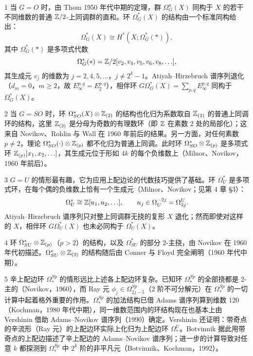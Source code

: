 \begin{example*}{1}
当 $G=O$ 时，由 Thom 1950 年代中期的定理，群 $\Omega_G^n(X)$ 同构于 $X$ 的若干不同维数的普通 $\mathbb{Z}/2$-上同调群的直和。环 $\Omega_G^*(X)$ 的结构由一个标准同构给出：
\[
\Omega_G^*(X)\cong H^*(X;\Omega_G^*(*)),
\]
其中 $\Omega_G^*(*)$ 是多项式代数
\[
\Omega_G^*(*)=\mathbb{Z}/2[v_2,v_4,v_5,v_6,v_8,\ldots],
\]
其生成元 $v_j$ 的维数为 $j=2,4,5,\ldots$，$j\ne 2^k-1$。Atiyah--Hirzebruch 谱序列退化（$d_m=0$，$m\ge 2$，故 $E_\infty^{p,q}=E_2^{p,q}$），相伴环 $G\Omega_G^*(X)=\sum_{p,q}E_\infty^{p,q}$ 同构于 $\Omega_G^*(X)$。
\end{example*}
\begin{example*}{2}
当 $G=SO$ 时，环 $\Omega_{SO}^*(X)\otimes\mathbb{Z}_{(2)}$ 的结构也化归为系数取自 $\mathbb{Z}_{(2)}$ 的普通上同调环的结构，这里 $\mathbb{Z}_{(2)}$ 是分母为奇数的有理数环（即 $\mathbb{Z}$ 在素数 2 处的局部化）；这来自 Novikov、Rohlin 与 Wall 在 1960 年前后的结果。另一方面，对任何素数 $p\ne 2$，理论 $\Omega_{SO}^*(\cdot)\otimes\mathbb{Z}_{(p)}$ 都不化归为普通上同调。此时环 $\Omega_{SO}^*\otimes\mathbb{Z}_{(p)}$ 是多项式环 $\mathbb{Z}_{(p)}[x_1,x_2,\ldots]$，其生成元位于形如 $4k$ 的每个负维数上（Milnor、Novikov，1960 年前后）。
\end{example*}
\begin{example*}{3}
$G=U$ 的情形最有趣，它为应用上配边论的代数技巧提供了基础。环 $\Omega_U^*$ 是多项式环，在每个偶的负维数上恰有一个生成元（Milnor、Novikov；见第 4 章 §3）：
\[
\Omega_U^*\cong\mathbb{Z}[u_1,u_2,\ldots],\qquad u_j\in\Omega_U^{-2j}=\Omega_{2j}^U.
\]
Atiyah--Hirzebruch 谱序列只对整上同调群无挠的复形 $X$ 退化；然而即使对这样的 $X$，相伴环 $G\Omega_U^*(X)$ 也未必同构于 $\Omega_U^*(X)$。
\end{example*}
\begin{example*}{4}
环 $\Omega_{SU}^*\otimes\mathbb{Z}_{(p)}$（$p>2$）的结构，以及 $\Omega_{SU}^*$ 的部分 2-主挠，由 Novikov 在 1960 年代初描述。$\Omega_{SU}^*\otimes\mathbb{Z}_{(2)}$ 的结构随后由 Conner 与 Floyd 完全阐明（1960 年代中期）。
\end{example*}
\begin{example}{5}
辛上配边环 $\Omega_*^{Sp}$ 的情形远比上述各上配边环复杂。已知环 $\Omega_*^{Sp}$ 的全部挠都是 2-主的（Novikov，1960），而 Ray 元 $\phi_j\in\Omega_{2j-5}^{Sp}$（2 阶不可分解元）在 $\Omega_*^{Sp}$ 的一切计算中起着格外重要的作用。$\Omega_*^{Sp}$ 的加法结构已借 Adams 谱序列算到维数 120（Kochman，1980 年代中期），同一维数范围内的环结构现在也基本上由 Vershinin 借助 Adams--Novikov 谱序列（1990）确定。Vershinin 还证明：带奇点的辛流形（Ray 元）的上配边环实际上化归为上配边环 $\Omega_*^U$。Botvinnik 据此用带奇点的上配边描述了辛上配边的 Adams--Novikov 谱序列；进一步的计算导致对任意 $k$ 都探测到 $\Omega_*^{Sp}$ 中 $2^k$ 阶的非平凡元（Botvinnik、Kochman，1992）。
\end{example}

